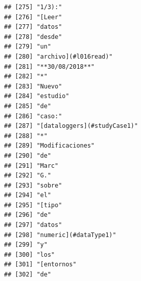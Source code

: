 \documentclass[
]{book}
\begin{document}
\begin{verbatim}
## [275] "1/3):"                                                                            
## [276] "[Leer"                                                                            
## [277] "datos"                                                                            
## [278] "desde"                                                                            
## [279] "un"                                                                               
## [280] "archivo](#l016read)"                                                              
## [281] "**30/08/2018**"                                                                   
## [282] "*"                                                                                
## [283] "Nuevo"                                                                            
## [284] "estudio"                                                                          
## [285] "de"                                                                               
## [286] "caso:"                                                                            
## [287] "[dataloggers](#studyCase1)"                                                       
## [288] "*"                                                                                
## [289] "Modificaciones"                                                                   
## [290] "de"                                                                               
## [291] "Marc"                                                                             
## [292] "G."                                                                               
## [293] "sobre"                                                                            
## [294] "el"                                                                               
## [295] "[tipo"                                                                            
## [296] "de"                                                                               
## [297] "datos"                                                                            
## [298] "numeric](#dataType1)"                                                             
## [299] "y"                                                                                
## [300] "los"                                                                              
## [301] "[entornos"                                                                        
## [302] "de"                                                                               

\end{verbatim}
\end{document}
